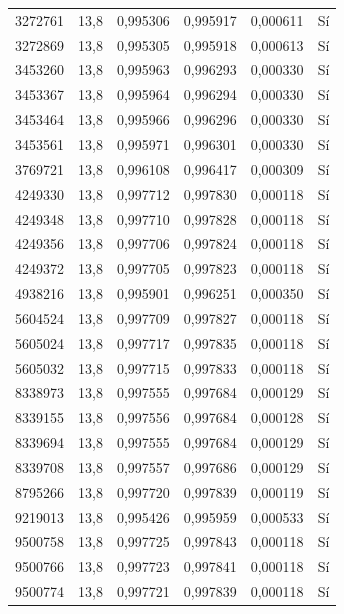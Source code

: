 \begin{longtable}{lccccc}
3272761 & 13,8 & 0,995306 & 0,995917 & 0,000611 & Sí \\
3272869 & 13,8 & 0,995305 & 0,995918 & 0,000613 & Sí \\
3453260 & 13,8 & 0,995963 & 0,996293 & 0,000330 & Sí \\
3453367 & 13,8 & 0,995964 & 0,996294 & 0,000330 & Sí \\
3453464 & 13,8 & 0,995966 & 0,996296 & 0,000330 & Sí \\
3453561 & 13,8 & 0,995971 & 0,996301 & 0,000330 & Sí \\
3769721 & 13,8 & 0,996108 & 0,996417 & 0,000309 & Sí \\
4249330 & 13,8 & 0,997712 & 0,997830 & 0,000118 & Sí \\
4249348 & 13,8 & 0,997710 & 0,997828 & 0,000118 & Sí \\
4249356 & 13,8 & 0,997706 & 0,997824 & 0,000118 & Sí \\
4249372 & 13,8 & 0,997705 & 0,997823 & 0,000118 & Sí \\
4938216 & 13,8 & 0,995901 & 0,996251 & 0,000350 & Sí \\
5604524 & 13,8 & 0,997709 & 0,997827 & 0,000118 & Sí \\
5605024 & 13,8 & 0,997717 & 0,997835 & 0,000118 & Sí \\
5605032 & 13,8 & 0,997715 & 0,997833 & 0,000118 & Sí \\
8338973 & 13,8 & 0,997555 & 0,997684 & 0,000129 & Sí \\
8339155 & 13,8 & 0,997556 & 0,997684 & 0,000128 & Sí \\
8339694 & 13,8 & 0,997555 & 0,997684 & 0,000129 & Sí \\
8339708 & 13,8 & 0,997557 & 0,997686 & 0,000129 & Sí \\
8795266 & 13,8 & 0,997720 & 0,997839 & 0,000119 & Sí \\
9219013 & 13,8 & 0,995426 & 0,995959 & 0,000533 & Sí \\
9500758 & 13,8 & 0,997725 & 0,997843 & 0,000118 & Sí \\
9500766 & 13,8 & 0,997723 & 0,997841 & 0,000118 & Sí \\
9500774 & 13,8 & 0,997721 & 0,997839 & 0,000118 & Sí \\
\end{longtable}
\endgroup
